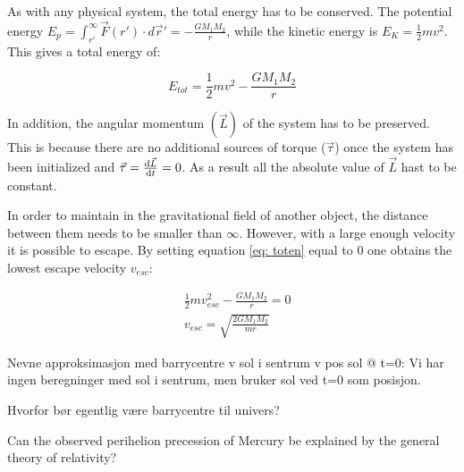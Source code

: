 As with any physical system, the total energy has to be conserved. The potential energy $ E_p = \int_{r'}^{\infty} \vec{F}(r') \cdot  d\vec{r}' = -\frac{G	M_1M_2}{r} $, while the kinetic energy is $ E_K  = \frac{1}{2}mv^2$. This gives a total energy of:

\begin{equation}
	E_{tot} = \frac{1}{2}mv^2 - \frac{G	M_1M_2}{r} \label{eq: toten}
\end{equation}

 In addition, the angular momentum $ (\vec{L}) $ of the system has to be preserved. This is because there are no additional sources of torque ($ \vec{\tau} $) once the system has been initialized and $ \vec{\tau} = \dv{{\vec{L}}}{t} =0$. As a result all the absolute value of $ \vec{L} $ hast to be constant. 

In order to maintain in the gravitational field of another object, the distance between them needs to be smaller than $ \infty $. However, with a large enough velocity it is possible to escape. By setting  equation \ref{eq: toten} equal to $ 0 $ one obtains the lowest escape velocity $ v_{esc} $: 


\begin{align}
&\frac{1}{2}mv_{esc}^2 - \frac{G	M_1M_2}{r}  = 0\\
& v_{esc} = \sqrt{ \frac{2G	M_1M_2}{mr}}
\end{align}








Nevne approksimasjon med barrycentre v sol i sentrum v pos sol @ t=0:
Vi har ingen beregninger med sol i sentrum, men bruker sol ved t=0 som posisjon. 

Hvorfor bør egentlig være barrycentre til univers?


Can the observed perihelion precession of Mercury be explained by the general theory of relativity?



